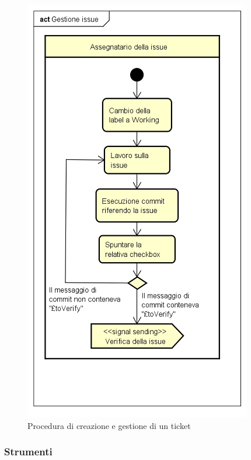 \documentclass[../NormeProgetto.tex]{subfiles}
\begin{document}
				\begin{figure}[H]
					\centering
					\includegraphics[scale=0.5, width=\textwidth]{sections/img/lavoroSuIssue.png}
					\caption{Procedura di creazione e gestione di un ticket}\label{fig:Procedura di creazione e gestione di un ticket - Parte 2} 
				\end{figure}
		\subsubsection{Strumenti}
\end{document}
